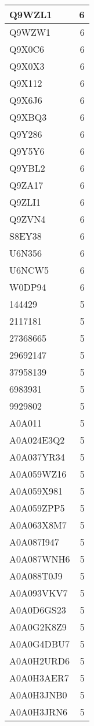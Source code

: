 \documentclass[
]{book}
\theoremstyle{definition}
\theoremstyle{definition}
\theoremstyle{definition}
\theoremstyle{definition}
\theoremstyle{remark}
\begin{document}
\begin{table}
\begin{tabular}{l|r}
\hline
Q9WZL1 & 6\\
\hline
Q9WZW1 & 6\\
\hline
Q9X0C6 & 6\\
\hline
Q9X0X3 & 6\\
\hline
Q9X112 & 6\\
\hline
Q9X6J6 & 6\\
\hline
Q9XBQ3 & 6\\
\hline
Q9Y286 & 6\\
\hline
Q9Y5Y6 & 6\\
\hline
Q9YBL2 & 6\\
\hline
Q9ZA17 & 6\\
\hline
Q9ZLI1 & 6\\
\hline
Q9ZVN4 & 6\\
\hline
S8EY38 & 6\\
\hline
U6N356 & 6\\
\hline
U6NCW5 & 6\\
\hline
W0DP94 & 6\\
\hline
144429 & 5\\
\hline
2117181 & 5\\
\hline
27368665 & 5\\
\hline
29692147 & 5\\
\hline
37958139 & 5\\
\hline
6983931 & 5\\
\hline
9929802 & 5\\
\hline
A0A011 & 5\\
\hline
A0A024E3Q2 & 5\\
\hline
A0A037YR34 & 5\\
\hline
A0A059WZ16 & 5\\
\hline
A0A059X981 & 5\\
\hline
A0A059ZPP5 & 5\\
\hline
A0A063X8M7 & 5\\
\hline
A0A087I947 & 5\\
\hline
A0A087WNH6 & 5\\
\hline
A0A088T0J9 & 5\\
\hline
A0A093VKV7 & 5\\
\hline
A0A0D6GS23 & 5\\
\hline
A0A0G2K8Z9 & 5\\
\hline
A0A0G4DBU7 & 5\\
\hline
A0A0H2URD6 & 5\\
\hline
A0A0H3AER7 & 5\\
\hline
A0A0H3JNB0 & 5\\
\hline
A0A0H3JRN6 & 5\\
\hline

\end{tabular}
\end{table}
\end{document}
